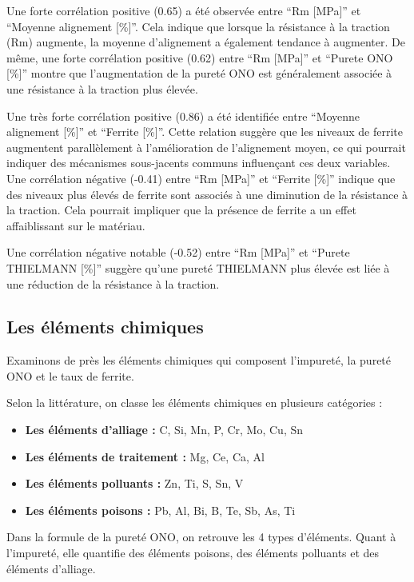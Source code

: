 \documentclass[12pt]{article}
\begin{document}
Une forte corrélation positive (0.65) a été observée entre “Rm [MPa]” et “Moyenne alignement [\%]”. Cela indique que lorsque la résistance à la traction (Rm) augmente, la moyenne d'alignement a également tendance à augmenter.
De même, une forte corrélation positive (0.62) entre “Rm [MPa]” et “Purete ONO [\%]” montre que l'augmentation de la pureté ONO est généralement associée à une résistance à la traction plus élevée.

Une très forte corrélation positive (0.86) a été identifiée entre “Moyenne alignement [\%]” et “Ferrite [\%]”. Cette relation suggère que les niveaux de ferrite augmentent parallèlement à l'amélioration de l'alignement moyen, ce qui pourrait indiquer des mécanismes sous-jacents communs influençant ces deux variables.
Une corrélation négative (-0.41) entre “Rm [MPa]” et “Ferrite [\%]” indique que des niveaux plus élevés de ferrite sont associés à une diminution de la résistance à la traction. Cela pourrait impliquer que la présence de ferrite a un effet affaiblissant sur le matériau.

Une corrélation négative notable (-0.52) entre “Rm [MPa]” et “Purete THIELMANN [\%]” suggère qu'une pureté THIELMANN plus élevée est liée à une réduction de la résistance à la traction.




\subsection{Les éléments chimiques}




Examinons de près les éléments chimiques qui composent l'impureté, la pureté ONO et le taux de ferrite.

Selon la littérature, on classe les éléments chimiques en plusieurs catégories :

\begin{itemize}
    \item \textbf{Les éléments d'alliage :}  C, Si, Mn, P, Cr, Mo, Cu, Sn 
    \item \textbf{Les éléments de traitement :} Mg, Ce, Ca, Al
    \item \textbf{Les éléments polluants :}  Zn, Ti, S, Sn, V 
    \item \textbf{Les éléments poisons :}  Pb, Al, Bi, B, Te, Sb, As, Ti
\end{itemize}
\vspace{5pt}
Dans la formule de la pureté ONO, on retrouve les 4 types d'éléments.
Quant à l'impureté, elle quantifie des éléments poisons, des éléments polluants et des éléments d'alliage.
\end{document}
